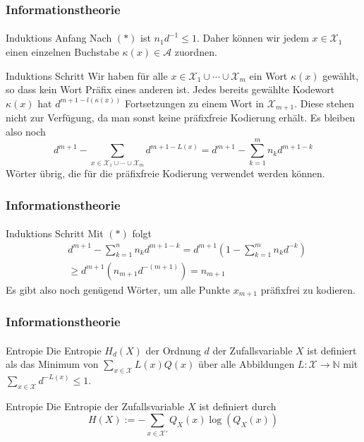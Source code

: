 \documentclass{beamer}
\begin{document}
\begin{frame}
    \frametitle{Informationstheorie}
\framesubtitle{}

\begin{block}{ Induktions Anfang}
Nach $(*)$ ist $n_1d^{-1} \leq 1$. Daher können wir jedem $x \in \mathcal{X}_1$ einen einzelnen Buchstabe $\kappa(x) \in \mathcal{A}$ zuordnen.
\end{block}

\begin{block}{ Induktions Schritt}
Wir haben für alle $x \in \mathcal{X}_1 \cup \cdots \cup \mathcal{X}_m$ ein Wort $\kappa(x)$ gewählt, so dass kein Wort Präfix eines  anderen ist. Jedes bereits gewählte Kodewort $\kappa(x)$ hat $d^{m+1 - l(\kappa(x))}$ Fortsetzungen zu einem Wort in $\mathcal{X}_{m+1}$. Diese stehen nicht zur Verfügung, da man sonst keine präfixfreie Kodierung erhält. Es bleiben also noch 
$$ d^{m+1} - \sum_{x \in \mathcal{X}_1 \cup \cdots \cup \mathcal{X}_m } d^{m+ 1 - L(x)} = d^{m+1} - \sum_{k=1}^{m} n_k d^{m+1-k}$$ 
Wörter übrig, die für die präfixfreie Kodierung verwendet werden können.
\end{block}

 \end{frame}


\begin{frame}
    \frametitle{Informationstheorie}
\framesubtitle{}



\begin{block}{ Induktions Schritt}
Mit $(*)$ folgt
\begin{align*}
& d^{m+1} - \sum_{k=1}^{n} n_k d^{m+1-k} = d^{m+1} (1 - \sum_{k=1}^{m} n_k d^{-k}) \\
& \geq d^{m+1}(n_{m+1} d^{-(m+1)}) = n_{m+1}
\end{align*}
Es gibt also noch genügend Wörter, um alle Punkte $x_{m+1}$ präfixfrei zu kodieren.
\end{block}

 \end{frame}


\begin{frame}
    \frametitle{Informationstheorie}
\framesubtitle{}

\begin{block}{Entropie}
Die Entropie $H_d(X)$ der Ordnung $d$ der Zufallsvariable $X$ ist definiert als das Minimum von $\sum_{x \in \mathcal{X} }  L(x) Q(x)$ über alle Abbildungen $L: \mathcal{X} \to \mathbb{N}$ mit $\sum_{x \in \mathcal{X} }  d^{-L(x)} \leq 1$.
\end{block}

\begin{block}{Entropie}
Die Entropie der Zufallsvariable $X$ ist definiert durch 
$$ H(X) := -\sum_{x \in \mathcal{X}' }   Q_X(x) \log(Q_X(x))$$
\end{block}


 \end{frame}
\end{document}

